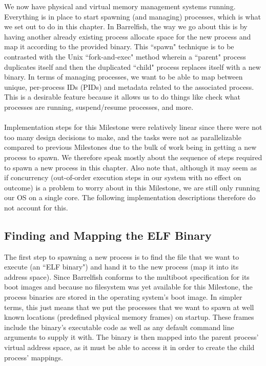 We now have physical and virtual memory management systems running. Everything is in place to start spawning (and managing) processes, which is what we set out to do in this chapter. In Barrelfish, the way we go about this is by having another already existing process allocate space for the new process and map it according to the provided binary. This ``spawn" technique is to be contrasted with the Unix ``fork-and-exec" method wherein a ``parent" process duplicates itself and then the duplicated ``child" process replaces itself with a new binary. In terms of managing processes, we want to be able to map between unique, per-process IDs (PIDs) and metadata related to the associated process. This is a desirable feature because it allows us to do things like check what processes are running, suspend/resume processes, and more.
\\\\
Implementation steps for this Milestone were relatively linear since there were not too many design decisions to make, and the tasks were not as parallelizable compared to previous Milestones due to the bulk of work being in getting a new process to spawn. We therefore speak mostly about the sequence of steps required to spawn a new process in this chapter. Also note that, although it may seem as if concurrency (out-of-order execution steps in our system with no effect on outcome) is a problem to worry about in this Milestone, we are still only running our OS on a single core. The following implementation descriptions therefore do not account for this.

\subsection{Finding and Mapping the ELF Binary}
The first step to spawning a new process is to find the file that we want to execute (an ``ELF binary") and hand it to the new process (map it into its address space). Since Barrelfish conforms to the multiboot specification for its boot images and because no filesystem was yet available for this Milestone, the process binaries are stored in the operating system's boot image. In simpler terms, this just means that we put the processes that we want to spawn at well known locations (predefined physical memory frames) on startup. These frames include the binary's executable code as well as any default command line arguments to supply it with. The binary is then mapped into the parent process' virtual address space, as it must be able to access it in order to create the child process' mappings.


